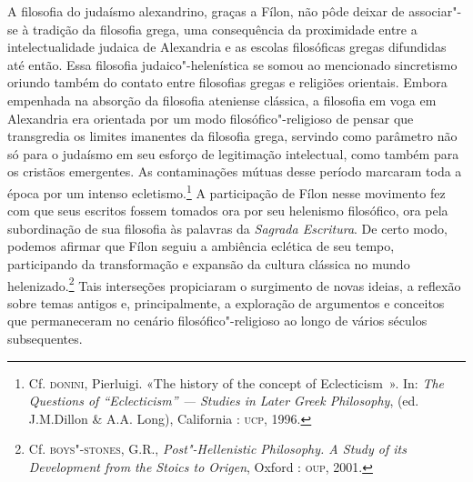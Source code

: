 A filosofia do judaísmo alexandrino, graças a Fílon, não pôde
deixar de associar"-se à tradição da filosofia grega, uma
consequência da proximidade entre a intelectualidade judaica de
Alexandria e as escolas filosóficas gregas difundidas até então.
Essa filosofia judaico"-helenística se somou ao mencionado
sincretismo oriundo também do contato entre filosofias gregas e
religiões orientais. Embora empenhada na absorção da filosofia
ateniense clássica, a filosofia em voga em Alexandria era
orientada por um modo filosófico"-religioso de pensar que
transgredia os limites imanentes da filosofia grega, servindo
como parâmetro não só para o judaísmo em seu esforço de
legitimação intelectual, como também para os cristãos
emergentes. As contaminações mútuas desse período marcaram toda
a época por um intenso
ecletismo.\footnote{ Cf.
\textsc{donini}, Pierluigi. «The history of the concept of
Eclecticism~». In: \emph{The Questions of ``Eclecticism'' ---
Studies in Later Greek Philosophy}, (ed. J.M.Dillon \& A.A.
Long), California : \textsc{ucp}, 1996.} A participação de Fílon nesse
movimento fez com que seus escritos fossem tomados ora por seu
helenismo filosófico, ora pela subordinação de sua filosofia às
palavras da \emph{Sagrada Escritura}. De certo modo, podemos
afirmar que Fílon seguiu a ambiência eclética de seu tempo,
participando da transformação e expansão da cultura clássica no
mundo helenizado.\footnote{ Cf.
\textsc{boys"-stones}, G.R., \emph{Post"-Hellenistic Philosophy.
A Study of its Development from the Stoics to Origen}, Oxford :
\textsc{oup}, 2001.} Tais interseções propiciaram o surgimento de novas
ideias, a reflexão sobre temas antigos e, principalmente, a
exploração de argumentos e conceitos que permaneceram no cenário
filosófico"-religioso ao longo de vários séculos subsequentes.

